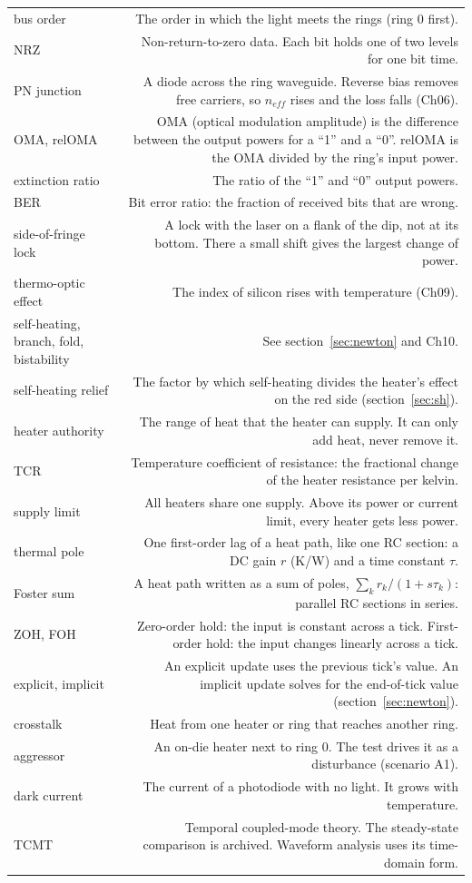 \documentclass[11pt,letterpaper]{article}
\begin{document}
{\begin{xltabular}{\linewidth}{@{}P{3.3cm} R@{}}
bus order & The order in which the light meets the rings (ring 0 first).\\
NRZ & Non-return-to-zero data. Each bit holds one of two levels for one bit time.\\
PN junction & A diode across the ring waveguide. Reverse bias removes free carriers, so $n_{eff}$ rises and the loss falls (Ch06).\\
OMA, relOMA & OMA (optical modulation amplitude) is the difference between the output powers for a ``1'' and a ``0''. relOMA is the OMA divided by the ring's input power.\\
extinction ratio & The ratio of the ``1'' and ``0'' output powers.\\
BER & Bit error ratio: the fraction of received bits that are wrong.\\
side-of-fringe lock & A lock with the laser on a flank of the dip, not at its bottom. There a small shift gives the largest change of power.\\
thermo-optic effect & The index of silicon rises with temperature (Ch09).\\
self-heating, branch, fold, bistability & See section~\ref{sec:newton} and Ch10.\\
self-heating relief & The factor by which self-heating divides the heater's effect on the red side (section~\ref{sec:sh}).\\
heater authority & The range of heat that the heater can supply. It can only add heat, never remove it.\\
TCR & Temperature coefficient of resistance: the fractional change of the heater resistance per kelvin.\\
supply limit & All heaters share one supply. Above its power or current limit, every heater gets less power.\\
thermal pole & One first-order lag of a heat path, like one RC section: a DC gain $r$ (K/W) and a time constant $\tau$.\\
Foster sum & A heat path written as a sum of poles, $\sum_k r_k/(1+s\tau_k)$: parallel RC sections in series.\\
ZOH, FOH & Zero-order hold: the input is constant across a tick. First-order hold: the input changes linearly across a tick.\\
explicit, implicit & An explicit update uses the previous tick's value. An implicit update solves for the end-of-tick value (section~\ref{sec:newton}).\\
crosstalk & Heat from one heater or ring that reaches another ring.\\
aggressor & An on-die heater next to ring 0. The test drives it as a disturbance (scenario A1).\\
dark current & The current of a photodiode with no light. It grows with temperature.\\
TCMT & Temporal coupled-mode theory. The steady-state comparison is archived. Waveform analysis uses its time-domain form.\\
\bottomrule
\end{xltabular}}
\end{document}

